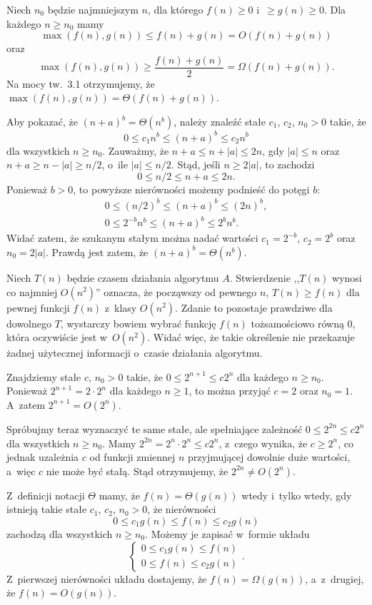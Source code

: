 
\exercise %
Niech $n_0$ będzie najmniejszym $n$, dla którego $f(n)\ge0$ i~$\ge g(n)\ge0$.
Dla każdego $n\ge n_0$ mamy
\[
    \max(f(n),g(n)) \le f(n)+g(n) = O(f(n)+g(n)) \tag{dla $c=1$ w~definicji $O$}
\]
oraz
\[
    \max(f(n),g(n)) \ge \frac{f(n)+g(n)}{2} = \Omega(f(n)+g(n)). \tag{dla $c=1/2$ w~definicji $\Omega$}
\]
Na mocy tw.\ 3.1 otrzymujemy, że $\max(f(n),g(n))=\Theta(f(n)+g(n))$.

\exercise %
Aby pokazać, że $(n+a)^b=\Theta(n^b)$, należy znaleźć stałe $c_1$, $c_2$, $n_0>0$ takie, że
\[
	0 \le c_1n^b \le (n+a)^b \le c_2n^b
\]
dla wszystkich $n\ge n_0$.
Zauważmy, że $n+a\le n+|a|\le2n$, gdy $|a|\le n$ oraz $n+a\ge n-|a|\ge n/2$, o~ile $|a|\le n/2$.
Stąd, jeśli $n\ge 2|a|$, to zachodzi
\[
	0 \le n/2 \le n+a \le 2n.
\]
Ponieważ $b>0$, to powyższe nierówności możemy podnieść do potęgi $b$:
\begin{gather*}
	0 \le (n/2)^b \le (n+a)^b \le (2n)^b, \\
	0 \le 2^{-b}n^b \le (n+a)^b \le 2^bn^b.
\end{gather*}
Widać zatem, że szukanym stałym można nadać wartości $c_1=2^{-b}$, $c_2=2^b$ oraz $n_0=2|a|$.
Prawdą jest zatem, że $(n+a)^b=\Theta(n^b)$.

\exercise %
Niech $T(n)$ będzie czasem działania algorytmu $A$.
Stwierdzenie ,,$T(n)$ wynosi co najmniej $O(n^2)$'' oznacza, że począwszy od pewnego $n$, $T(n)\ge f(n)$ dla pewnej funkcji $f(n)$ z~klasy $O(n^2)$.
Zdanie to pozostaje prawdziwe dla dowolnego $T$, wystarczy bowiem wybrać funkcję $f(n)$ tożsamościowo równą 0, która oczywiście jest w~$O(n^2)$.
Widać więc, że takie określenie nie przekazuje żadnej użytecznej informacji o~czasie działania algorytmu.

\exercise %
Znajdziemy stałe $c$, $n_0>0$ takie, że $0\le2^{n+1}\le c2^n$ dla każdego $n\ge n_0$.
Ponieważ $2^{n+1}=2\cdot2^n$ dla każdego $n\ge1$, to można przyjąć $c=2$ oraz $n_0=1$.
A~zatem $2^{n+1}=O(2^n)$.

Spróbujmy teraz wyznaczyć te same stałe, ale spełniające zależność $0\le2^{2n}\le c2^n$ dla wszystkich $n\ge n_0$.
Mamy $2^{2n}=2^n\cdot2^n\le c2^n$, z~czego wynika, że $c\ge2^n$, co jednak uzależnia $c$ od funkcji zmiennej $n$ przyjmującej dowolnie duże wartości, a~więc $c$ nie może być stałą.
Stąd otrzymujemy, że $2^{2n}\ne O(2^n)$.

\exercise %
Z~definicji notacji $\Theta$ mamy, że $f(n)=\Theta(g(n))$ wtedy i~tylko wtedy, gdy istnieją takie stałe $c_1$, $c_2$, $n_0>0$, że nierówności
\[
	0 \le c_1g(n) \le f(n) \le c_2g(n)
\]
zachodzą dla wszystkich $n\ge n_0$.
Możemy je zapisać w~formie układu
\[
	\begin{cases}
		0 \le c_1g(n) \le f(n) \\
		0 \le f(n) \le c_2g(n)
	\end{cases}.
\]
Z~pierwszej nierówności układu dostajemy, że $f(n)=\Omega(g(n))$, a~z~drugiej, że $f(n)=O(g(n))$.

